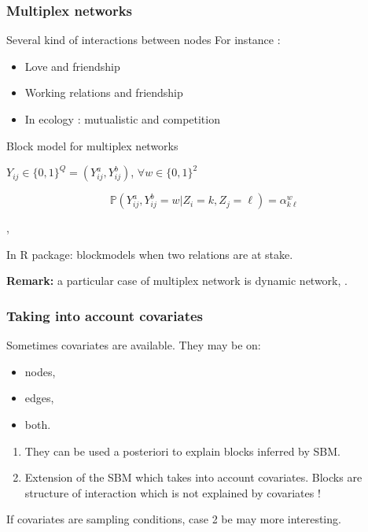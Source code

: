 \documentclass[compress,10pt]{beamer}
\begin{document}
\begin{frame} \frametitle{Multiplex networks}
Several kind of interactions between nodes
For instance : 


\begin{itemize}
\item Love and friendship
\item Working relations and friendship
\item  In ecology : mutualistic and competition
\end{itemize}


\begin{block}{Block model for multiplex networks}

$Y_{ij} \in \{0,1\} ^ Q = (Y_{ij}^a, Y_{ij}^b)$, $\forall w \in \{0,1\}^2$ 



$$\mathbb{P}(Y^a_{ij},Y^b_{ij} = w  | Z_i  = k, Z_j = \ell)  = \alpha^w _{k\ell}$$

\end{block}

\textcolor{mygreen}{
\cite{kefi}, \cite{barbillon2017stochastic}}

In \textcolor{mygreen}{R package: blockmodels} when two relations are at stake.
 

 \textbf{Remark:} a particular case of multiplex network is dynamic network, \textcolor{mygreen}{\cite{matias2017statistical}}.
 

 \end{frame}
\begin{frame}\frametitle{Taking into account covariates}
 Sometimes covariates are available. They may be on:
 \begin{itemize}
  \item nodes,
  \item edges,
  \item both.
 \end{itemize}

 
 
 \begin{enumerate}
  \item They can be used a posteriori to explain blocks inferred by SBM.
  \item Extension of the SBM which takes into account covariates. Blocks are structure of interaction which is not 
  explained by covariates !

 \end{enumerate}


 If covariates are sampling conditions, case 2  be  may more interesting.
 
\end{frame}
\end{document}
